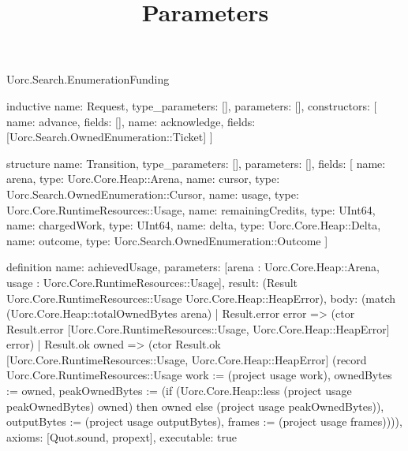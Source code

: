 \begin{lexlean}{Uorc.Search.EnumerationFunding}
\title{Parameters}
\begin{semanticmodule}
inductive{
  name: Request,
  type_parameters: [],
  parameters: [],
  constructors: [
    {name: advance, fields: []},
    {name: acknowledge, fields: [Uorc.Search.OwnedEnumeration::Ticket]}
  ]
}

structure{
  name: Transition,
  type_parameters: [],
  parameters: [],
  fields: [
    {name: arena, type: Uorc.Core.Heap::Arena},
    {name: cursor, type: Uorc.Search.OwnedEnumeration::Cursor},
    {name: usage, type: Uorc.Core.RuntimeResources::Usage},
    {name: remainingCredits, type: UInt64},
    {name: chargedWork, type: UInt64},
    {name: delta, type: Uorc.Core.Heap::Delta},
    {name: outcome, type: Uorc.Search.OwnedEnumeration::Outcome}
  ]
}

definition{
  name: achievedUsage,
  parameters: [arena : Uorc.Core.Heap::Arena, usage : Uorc.Core.RuntimeResources::Usage],
  result: (Result Uorc.Core.RuntimeResources::Usage Uorc.Core.Heap::HeapError),
  body: (match (Uorc.Core.Heap::totalOwnedBytes arena)
    | Result.error error => (ctor Result.error [Uorc.Core.RuntimeResources::Usage, Uorc.Core.Heap::HeapError] error)
    | Result.ok owned => (ctor Result.ok [Uorc.Core.RuntimeResources::Usage, Uorc.Core.Heap::HeapError] (record Uorc.Core.RuntimeResources::Usage {work := (project usage work), ownedBytes := owned, peakOwnedBytes := (if (Uorc.Core.Heap::less (project usage peakOwnedBytes) owned) then owned else (project usage peakOwnedBytes)), outputBytes := (project usage outputBytes), frames := (project usage frames)}))),
  axioms: [Quot.sound, propext],
  executable: true
}


\end{semanticmodule}
\end{lexlean}
